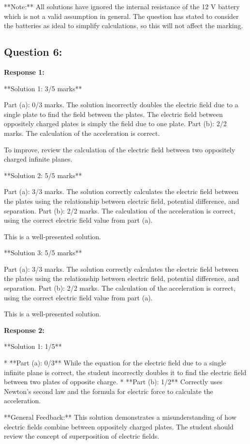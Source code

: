 \documentclass[a4paper,11pt]{article}
\begin{document}
**Note:** All solutions have ignored the internal resistance of the 12 V battery which is not a valid assumption in general. The question has stated to consider the batteries as ideal to simplify calculations, so this will not affect the marking.

\subsection*{Question 6:}

\textbf{Response 1:}

**Solution 1: 3/5 marks**

Part (a): 0/3 marks. The solution incorrectly doubles the electric field due to a single plate to find the field between the plates. The electric field between oppositely charged plates is simply the field due to one plate.
Part (b): 2/2 marks. The calculation of the acceleration is correct.

To improve, review the calculation of the electric field between two oppositely charged infinite planes.

**Solution 2: 5/5 marks**

Part (a): 3/3 marks. The solution correctly calculates the electric field between the plates using the relationship between electric field, potential difference, and separation.
Part (b): 2/2 marks. The calculation of the acceleration is correct, using the correct electric field value from part (a).

This is a well-presented solution.

**Solution 3: 5/5 marks**

Part (a): 3/3 marks. The solution correctly calculates the electric field between the plates using the relationship between electric field, potential difference, and separation.
Part (b): 2/2 marks. The calculation of the acceleration is correct, using the correct electric field value from part (a).

This is a well-presented solution.


\textbf{Response 2:}

**Solution 1: 1/5**

*   **Part (a): 0/3** While the equation for the electric field due to a single infinite plane is correct, the student incorrectly doubles it to find the electric field between two plates of opposite charge.
*   **Part (b): 1/2** Correctly uses Newton's second law and the formula for electric force to calculate the acceleration.

**General Feedback:** This solution demonstrates a misunderstanding of how electric fields combine between oppositely charged plates. The student should review the concept of superposition of electric fields.
\end{document}
